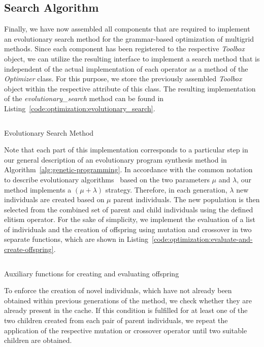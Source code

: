 \subsection{Search Algorithm}
\label{sec:evostencils-part1:search-algorithm}
Finally, we have now assembled all components that are required to implement an evolutionary search method for the grammar-based optimization of multigrid methods.
Since each component has been registered to the respective \emph{Toolbox} object, we can utilize the resulting interface to implement a search method that is independent of the actual implementation of each operator as a method of the \emph{Optimizer} class. 
For this purpose, we store the previously assembled \emph{Toolbox} object within the respective attribute of this class.
The resulting implementation of the \emph{evolutionary\_search} method can be found in Listing~\ref{code:optimization:evolutionary_search}. 
\begin{listing}
	\inputminted[linenos]{python}{evostencils/optimization/evolutionary_search.py}
	\caption{Evolutionary Search Method}
	\label{code:optimization:evolutionary_search}
\end{listing}
Note that each part of this implementation corresponds to a particular step in our general description of an evolutionary program synthesis method in Algorithm~\ref{alg:genetic-programming}.
In accordance with the common notation to describe evolutionary algorithms~\cite{back1997handbook} based on the two parameters $\mu$ and $\lambda$, our method implements a $\left(\mu + \lambda \right)$ strategy.
Therefore, in each generation, $\lambda$ new individuals are created based on $\mu$ parent individuals.
The new population is then selected from the combined set of parent and child individuals using the defined elitism operator.
For the sake of simplicity, we implement the evaluation of a list of individuals and the creation of offspring using mutation and crossover in two separate functions, which are shown in Listing~\ref{code:optimization:evaluate-and-create-offspring}.
\begin{listing}
	\inputminted{python}{evostencils/optimization/evolutionary_search_helper.py}
	\caption{Auxiliary functions for creating and evaluating offspring}
	\label{code:optimization:evaluate-and-create-offspring}
\end{listing}
To enforce the creation of novel individuals, which have not already been obtained within previous generations of the method, we check whether they are already present in the cache.
If this condition is fulfilled for at least one of the two children created from each pair of parent individuals, we repeat the application of the respective mutation or crossover operator until two suitable children are obtained.
